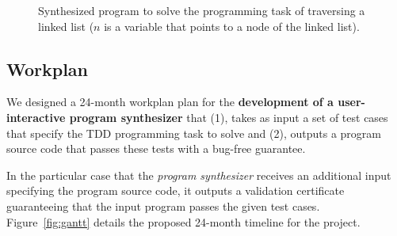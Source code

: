 \documentclass[10pt,a4paper]{paper}
\begin{document}
\begin{figure}[hbt!]
\begin{center}
\end{center}
\caption{\small Synthesized program to solve the programming task of traversing a linked list ($n$ is a variable that points to a node of the linked list).}
\label{fig:list}
\end{figure}



\subsection{Workplan}
We designed a 24-month workplan plan for the {\bf development of a user-interactive program synthesizer} that (1), takes as input a set of test cases that specify the TDD programming task to solve and (2), outputs a program source code that passes these tests with a bug-free guarantee.

In the particular case that the {\em program synthesizer} receives an additional input specifying the program source code, it outputs a validation certificate guaranteeing that the input program passes the given test cases. Figure~\ref{fig:gantt} details the proposed 24-month timeline for the project.
\end{document}
